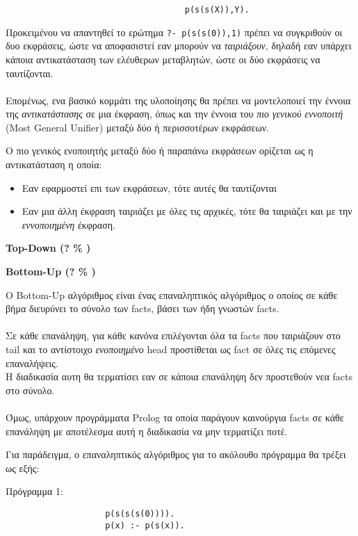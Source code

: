 \documentclass[10pt]{article}
\begin{document}
\begin{verbatim}
                                    p(s(s(X)),Y).
\end{verbatim}

Προκειμένου να απαντηθεί το ερώτημα \verb|?- p(s(s(0)),1)| πρέπει να συγκριθούν οι δυο εκφράσεις, ώστε να αποφασιστεί εαν μπορούν να \textit{ταιριάξουν}, δηλαδή εαν υπάρχει κάποια αντικατάσταση των ελέυθερων μεταβλητών, ώστε οι δύο εκφράσεις να ταυτίζονται. \\
\\
Επομένως, ενα βασικό κομμάτι της υλοποίησης θα πρέπει να μοντελοποιεί την έννοια της \textit{αντικατάστασης} σε μια έκφραση, όπως και την έννοια του \textit{πιο γενικού εννοποιτή} (Most General Unifier) μεταξύ δύο ή περισσοτέρων εκφράσεων.

Ο πιο γενικός ενοποιητής μεταξύ δύο ή παραπάνω εκφράσεων ορίζεται ως η αντικατάσταση η οποία:
\begin{itemize}
    \item Εαν εφαρμοστεί επι των εκφράσεων, τότε αυτές θα ταυτίζονται 
    \item Εαν μια άλλη έκφραση ταιριάζει με όλες τις αρχικές, τότε θα ταιριάζει και με την \textit{εννοποιημένη} έκφραση.
\end{itemize}


\textbf{Top-Down (? \% )}

\textbf{Bottom-Up (? \% )}

O Bottom-Up αλγόριθμος είναι ένας επαναληπτικός αλγόριθμος ο οποίος σε κάθε βήμα διευρύνει το σύνολο των facts, βάσει των ήδη γνωστών facts.\\
\\
Σε κάθε επανάληψη, για κάθε κανόνα επιλέγονται όλα τα facts που ταιριάζουν στο tail και το αντίστοιχο \textit{ενοποιημένο} head προστίθεται ως fact σε όλες τις επόμενες επαναλήψεις.   
\\
Η διαδικασία αυτη θα τερματίσει εαν σε κάποια επανάληψη δεν προστεθούν νεα facts στο σύνολο.\\
\\
Όμως, υπάρχουν προγράμματα Prolog τα οποία παράγουν καινούργια facts σε κάθε επανάληψη με αποτέλεσμα αυτή η διαδικασία να μην τερματίζει ποτέ. 

Για παράδειγμα, ο επαναληπτικός αλγόριθμος για το ακόλουθο πρόγραμμα θα τρέξει ως εξής:


Πρόγραμμα 1:
\begin{verbatim}
                    p(s(s(s(0)))).
                    p(x) :- p(s(x)).
\end{verbatim}
\end{document}
